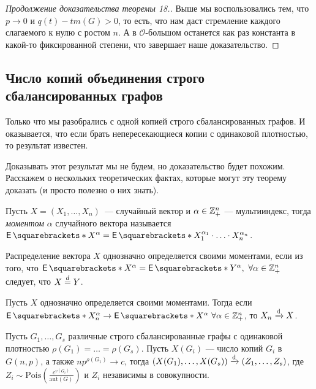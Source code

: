 \begin{proof}[Продолжение доказательства теоремы 18.]
  Выше мы воспользовались тем, что $p \to 0$ и $q(t) - tm(G) > 0$, то есть, что
  нам даст стремление каждого слагаемого к нулю с ростом $n$. А в 
  $\mathcal{O}$-большом останется как раз константа в какой-то фиксированной
  степени, что завершает наше доказательство.
\end{proof}


\subsection{Число копий объединения строго сбалансированных графов}

Только что мы разобрались с одной копией строго сбалансированных графов. И оказывается,
что если брать непересекающиеся копии с одинаковой плотностью, то результат известен.

Доказывать этот результат мы не будем, но доказательство будет похожим. Расскажем
о нескольких теоретических фактах, которые могут эту теорему доказать (и просто
полезно о них знать).

\begin{definition}
  Пусть $X = (X_1, \ldots, X_n)$~--- случайный вектор и $\alpha \in \mathbb{Z}_+^n$ ---
  мультииндекс, тогда \textit{моментом} $\alpha$ случайного вектора называется 
  $\E{X^\alpha} = \E{X_1^{\alpha_1}\cdot\ldots\cdot X_n^{\alpha_n}}$.
\end{definition}

\begin{definition}
  Распределение вектора $X$ однозначно определяется своими моментами, если из того,
  что $\E{X^\alpha} = \E{Y^\alpha}, \ \forall \alpha \in \Z_+^n$ следует, что $X \overset{d}{=} Y$.
\end{definition}

\begin{lemma}
  Пусть $X$ однозначно определяется своими моментами. Тогда если 
  $\E{X_n^\alpha} \to \E{X^\alpha} \ \forall \alpha \in \Z_+^n$, то $X_n \xrightarrow{\mathrm{d}} X$.
\end{lemma}

\begin{theorem}
  Пусть $G_1, \ldots,G_s$ различные строго сбалансированные графы с одинаковой
  плотностью $\rho(G_1) = \ldots = \rho(G_s)$.
  Пусть $X(G_i)$ --- число копий $G_i$ в $G(n, p)$, а также
  $np^{\rho(G_1)} \to c$, тогда
  $(X(G_1),\ldots, X(G_s)) \xrightarrow{\mathrm{d}} (Z_1, \ldots, Z_s)$, где $Z_i \sim 
  \mathrm{Pois}\left(\frac{c^{v(G_i)}}{\mathrm{aut}(G)}\right)$ и $Z_i$ независимы
  в совокупности.
\end{theorem}

